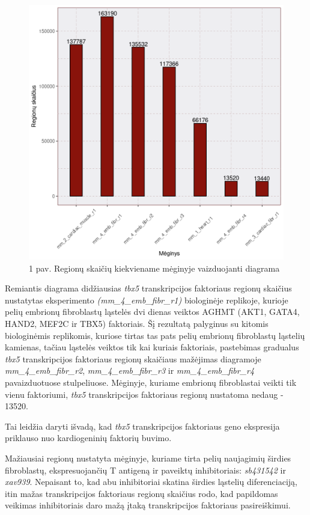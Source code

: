\documentclass[12pt]{article}
\begin{document}
\begin{figure}[htb]
    \begin{center}
        \includegraphics[width=0.7\linewidth]{Figures/total_peak_counts.png}
        \caption*{1 pav. Regionų skaičių kiekviename mėginyje vaizduojanti diagrama}
    \end{center}
\end{figure}

Remiantis diagrama didžiausias \emph{tbx5} transkripcijos faktoriaus
regionų skaičius nustatytas eksperimento \emph{(mm\_4\_emb\_fibr\_r1)}
biologinėje replikoje, kurioje pelių embrionų fibroblastų ląstelės
dvi dienas veiktos AGHMT (AKT1, GATA4, HAND2, MEF2C ir TBX5) faktoriais.
Šį rezultatą palyginus su kitomis biologinėmis replikomis, kuriose
tirtas tas pats pelių embrionų fibroblastų ląstelių kamienas, tačiau
ląstelės veiktos tik kai kuriais faktoriais, pastebimas gradualus
\emph{tbx5} transkripcijos faktoriaus regionų skaičiaus mažėjimas
diagramoje \emph{mm\_4\_emb\_fibr\_r2}, \emph{mm\_4\_emb\_fibr\_r3} ir
\emph{mm\_4\_emb\_fibr\_r4} pavaizduotuose stulpeliuose. Mėginyje,
kuriame embrionų fibroblastai veikti tik vienu faktoriumi,
\emph{tbx5} transkripcijos faktoriaus regionų nustatoma nedaug -
13520.

Tai leidžia daryti išvadą, kad \emph{tbx5} transkripcijos faktoriaus
geno ekspresija priklauso nuo kardiogeninių faktorių buvimo.

Mažiausiai regionų nustatyta mėginyje, kuriame tirta pelių
naujagimių širdies fibroblastų, ekspresuojančių T antigeną
ir paveiktų inhibitoriais: \emph{sb431542} ir \emph{xav939}.
Nepaisant to, kad abu inhibitoriai skatina širdies ląstelių
diferenciaciją, itin mažas transkripcijos faktoriaus regionų
skaičius rodo, kad papildomas veikimas inhibitoriais daro
mažą įtaką transkripcijos faktoriaus pasireiškimui.
\end{document}
